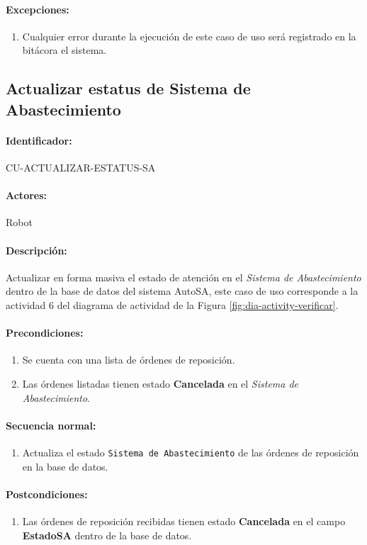 \paragraph{Excepciones:}
\begin{enumerate}
  \item Cualquier error durante la ejecución de este caso de uso será registrado en la bitácora el sistema.
\end{enumerate}


\subsection{Actualizar estatus de Sistema de Abastecimiento}\label{cu-actualizar-estatus-sa}
\paragraph{Identificador:}
CU-ACTUALIZAR-ESTATUS-SA
\paragraph{Actores:}
Robot
\paragraph{Descripción:}
Actualizar en forma masiva el estado de atención en el \textit{Sistema de Abastecimiento} dentro de la base de datos del sistema AutoSA, este caso de uso corresponde a la actividad 6 del diagrama de actividad de la Figura \ref{fig:dia-activity-verificar}.
\paragraph{Precondiciones:}
\begin{enumerate}
  \item Se cuenta con una lista de órdenes de reposición.
  \item Las órdenes listadas tienen estado \textbf{Cancelada} en el \textit{Sistema de Abastecimiento}. 
\end{enumerate}
\paragraph{Secuencia normal:}
\begin{enumerate}
  \item Actualiza el estado \texttt{Sistema de Abastecimiento} de las órdenes de reposición en la base de datos.
\end{enumerate}
\paragraph{Postcondiciones:}
\begin{enumerate}
  \item Las órdenes de reposición recibidas tienen estado \textbf{Cancelada} en el campo \textbf{EstadoSA} dentro de la base de datos.
\end{enumerate}
